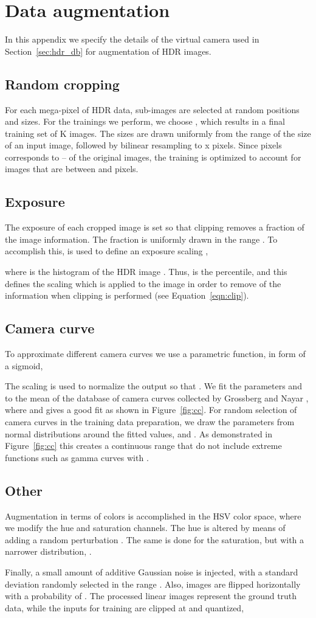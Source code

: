 \documentclass[acmtog]{acmart}
\newcommand{\figref}[1]{Figure~\ref{fig:#1}}
\newcommand{\eqnref}[1]{Equation~\ref{eqn:#1}}
\newcommand{\secref}[1]{Section~\ref{sec:#1}}
\newcommand\customsection[1]{\subsection{#1}}
\begin{document}
\appendix
\section{Data augmentation}\label{app:augmentation}
In this appendix we specify the details of the virtual camera used in \secref{hdr_db} for augmentation of HDR images.

\customsection{Random cropping}
For each mega-pixel of HDR data,  sub-images are selected at random positions and sizes.  For the trainings we perform, we choose , which results in a final training set of K images. The sizes are drawn uniformly from the range  of the size of an input image, followed by bilinear resampling to x pixels. Since  pixels corresponds to -- of the original images, the training is optimized to account for images that are between  and  pixels.

\customsection{Exposure}
The exposure of each cropped image is set so that clipping removes a fraction  of the image information. The fraction is uniformly drawn in the range . To accomplish this,  is used to define an exposure scaling ,

where  is the histogram of the HDR image .  Thus,  is the  percentile, and this defines the scaling  which is applied to the image in order to remove  of the information when clipping is performed (see \eqnref{clip}).

\customsection{Camera curve}
To approximate different camera curves we use a parametric function, in form of a sigmoid,

The scaling  is used to normalize the output so that . We fit the parameters  and  to the mean of the database of camera curves collected by Grossberg and Nayar \citeyear{Grossberg2003}, where  and  gives a good fit as shown in \figref{cc}. For random selection of camera curves in the training data preparation, we draw the parameters from normal distributions around the fitted values,  and . As demonstrated in \figref{cc} this creates a continuous range that do not include extreme functions such as gamma curves with .

\customsection{Other}
Augmentation in terms of colors is accomplished in the HSV color space, where we modify the hue and saturation channels. The hue is altered by means of adding a random perturbation . The same is done for the saturation, but with a narrower distribution, .

Finally, a small amount of additive Gaussian noise is injected, with a standard deviation randomly selected in the range . Also, images are flipped horizontally with a probability of . The processed linear images  represent the ground truth data, while the inputs for training are clipped at  and quantized, 
\end{document}
